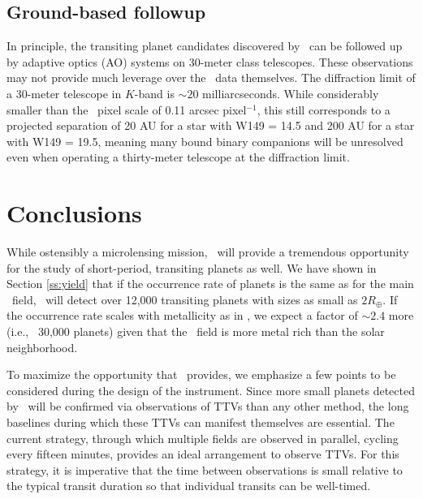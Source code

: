 \subsection{Ground-based followup}

In principle, the transiting planet candidates discovered by \WF\ can be followed
up by adaptive optics (AO) systems on 30-meter class telescopes. 
These observations may not provide much leverage over the \WF\ data themselves.
The diffraction limit of a 30-meter telescope in $K$-band is $\sim 20$ milliarcseconds.
While considerably smaller than the \WF\ pixel scale of 0.11 arcsec pixel$^{-1}$, this still
corresponds to a projected separation of 20 AU for a star with W149 = 14.5 and 200 AU
for a star with W149 = 19.5, meaning many bound binary companions will be unresolved 
even when operating a thirty-meter telescope at the diffraction limit.


\section{Conclusions}


While ostensibly a microlensing mission, \WF\ will provide a 
tremendous opportunity for the study of short-period, transiting planets as well. We have shown in Section \ref{ss:yield} that if the occurrence rate of planets is the same as for the main \kep\ field, \WF\ will detect over 12,000 transiting planets with sizes as small as $2 R_{\oplus}$. If the occurrence rate scales with metallicity as in \citet{Johnson10a}, we expect a factor of $\sim 2.4$ more (i.e., ~30,000 planets) given that the \WF\ field is more metal rich than the solar neighborhood.

To maximize the opportunity that \WF\ provides, we emphasize a few points to be considered 
during the 
design of the instrument.
Since more small planets detected by \WF\ will be confirmed via observations of 
TTVs than any other method, the long baselines during which these TTVs can manifest
themselves are essential. 
The current strategy, through which multiple fields are observed in parallel, cycling
every fifteen minutes, provides an ideal arrangement to observe TTVs.
For this strategy, it is imperative that the time between observations is small relative
to the typical transit duration so that individual transits can be well-timed.

